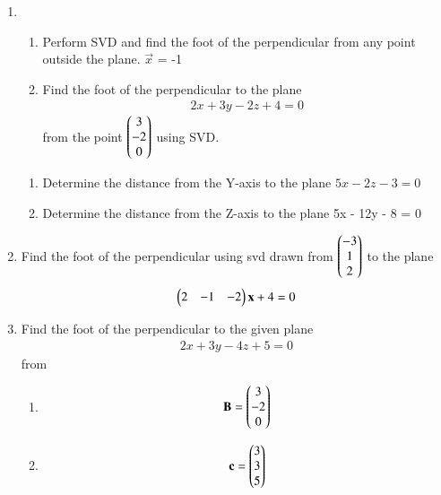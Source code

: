 \begin{enumerate}[label=\thesubsection.\arabic*.,ref=\thesubsection.\theenumi]
\begin{enumerate}
\end{enumerate}
\item 
\begin{enumerate}
\item Perform SVD and find the foot of the perpendicular from any point outside the plane.
 $\vec{x}$ = -1
%
\solution

\item Find the foot of the perpendicular to the plane
\begin{align}
2x+3y-2z+4 = 0 \label{eq:solutions/4/45/3/b/eq:equation}
\end{align}
from the point $\begin{pmatrix}3\\-2\\0\end{pmatrix}$ using SVD.
%
\solution

\end{enumerate}
\begin{enumerate}
\item Determine the distance from the Y-axis to the plane $5x - 2z - 3 = 0$
%
\\
\solution

\item Determine the distance from the Z-axis to the plane 5x - 12y - 8 = 0
%
\\
\solution


\end{enumerate}

\item Find the foot of the perpendicular using svd drawn from $\begin{pmatrix}-3\\1\\2\end{pmatrix}$ to the plane
 \begin{align}
 \begin{pmatrix}2&-1&-2\end{pmatrix}\mathbf{x}+4=0
 \end{align}
%
\solution

\item Find the foot of the perpendicular 
to the given plane
\begin{align}
2x+3y-4z+5=0 
\end{align}
from
\begin{enumerate}
\item 
\begin{align}
\mathbf{B}=\begin{pmatrix}3\\-2\\0\end{pmatrix}
\end{align}
%
\solution

%
\item 
\begin{align}
\mathbf{c}=\begin{pmatrix}3\\3\\5\end{pmatrix}
\end{align}
\solution

\end{enumerate}
\end{enumerate}



